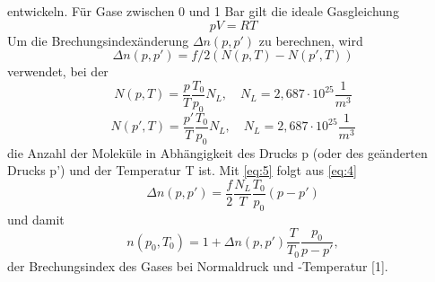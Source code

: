 entwickeln. Für Gase zwischen 0 und 1 Bar gilt die ideale Gasgleichung
\begin{equation}
  pV=RT 
  \label{eq:3}
\end{equation}
Um die Brechungsindexänderung $\Delta n(p,p')$ zu berechnen, wird 
\begin{equation}
  \Delta n(p,p')=f/2(N(p,T)-N(p',T))
  \label{eq:4}
\end{equation}
verwendet, bei der 
\begin{equation}
  N(p,T)=\frac{p}{T}\frac{T_{0}}{p_{0}}N_{L}, \quad N_{L}=2,687\cdot 10^25\frac{1}{m^3} \nonumber
\end{equation}
\begin{equation}
  N(p',T)=\frac{p'}{T}\frac{T_{0}}{p_{0}}N_{L}, \quad N_{L}=2,687\cdot 10^25\frac{1}{m^3}
  \label{eq:5}
\end{equation}
die Anzahl der Moleküle in Abhängigkeit des Drucks p (oder des geänderten Drucks p') und der Temperatur T ist.
Mit \eqref{eq:5} folgt aus \eqref{eq:4}
\begin{equation}
  \Delta n(p,p')=\frac{f}{2}\frac{N_{L}}{T}\frac{T_{0}}{p_{0}}(p-p') 
  \label{eq:5}
\end{equation}
und damit
\begin{equation}
  n(p_{0},T_{0})=1+\Delta n(p,p')\frac{T}{T_{0}}\frac{p_0}{p-p'},
  \label{eq:brechin}
\end{equation}
der Brechungsindex des Gases bei Normaldruck und -Temperatur [1].
